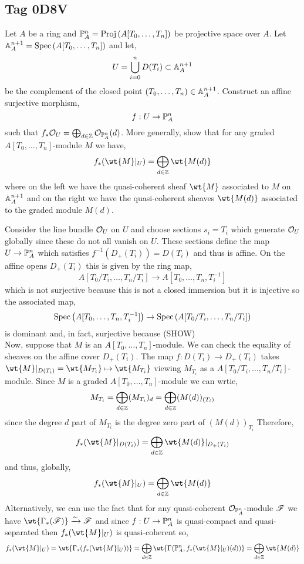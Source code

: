 \documentclass[12pt]{article}
\begin{document}
\subsection{Tag 0D8V}

\begin{exr}
Let $A$ be a ring and $\P^n_A = \Proj{A[T_0, \dots, T_n]}$ be projective space over $A$. Let $\A^{n+1}_A = \Spec{A[T_0, \dots, T_n]}$ and let,
\[ U = \bigcup_{i = 0}^n D(T_i) \subset \A_A^{n+1} \]
be the complement of the closed point $(T_0, \dots, T_n) \in \A_A^{n+1}$. Construct an affine surjective morphism,
\[ f : U \to \P^n_A \]
such that $f_* \struct{U} = \bigoplus_{d \in \Z} \struct{\P^n_A}(d)$. More generally, show that for any graded $A[T_0, \dots, T_n]$-module $M$ we have,
\[ f_*(\wt{M}|_U) = \bigoplus_{d \in \Z} \wt{M(d)} \]
where on the left we have the quasi-coherent sheaf $\wt{M}$ associated to $M$ on $\A^{n+1}_A$ and on the right we have the quasi-coherent sheaves $\wt{M(d)}$ associated to the graded module $M(d)$. 
\end{exr}
\noindent
Consider the line bundle $\struct{U}$ on $U$ and choose sections $s_i = T_i$ which generate $\struct{U}$ globally since these do not all vanish on $U$. These sections define the map $U \to \P^n_A$ which satisfies $f^{-1}(D_{+}(T_i)) = D(T_i)$ and thus is affine. On the affine opens $D_+(T_i)$ this is given by the ring map,
\[ A[T_0/T_i, \dots, T_n/T_i] \to A[T_0, \dots, T_n, T_i^{-1}] \]
which is not surjective because this is not a closed immersion but it is injective so the associated map,
\[ \Spec{A[T_0, \dots, T_n, T_i^{-1}]} \to \Spec{A[T_0/T_i, \dots, T_n/T_i]} \]
is dominant and, in fact, surjective because (SHOW)
\bigskip\\
Now, suppose that $M$ is an $A[T_0, \dots, T_n]$-module. We can check the equality of sheaves on the affine cover $D_+(T_i)$. The map $f : D(T_i) \to D_{+}(T_i)$ takes $\wt{M}|_{D(T_i)} = \wt{M_{T_i}} \mapsto \wt{M_{T_i}}$ viewing  $M_{T_i}$ as a $A[T_0/T_i, \dots, T_n/T_i]$-module. Since $M$ is a graded $A[T_0, \dots, T_n]$-module we can wrtie,
\[ M_{T_i} = \bigoplus_{d \in \Z} (M_{T_i})_d = \bigoplus_{d \in \Z} (M(d))_{(T_i)} \]
since the degree $d$ part of $M_{T_i}$ is the degree zero part of $(M(d))_{T_i}$
Therefore,
\[ f_*(\wt{M}|_{D(T_i)}) = \bigoplus_{d \in \Z} \wt{M(d)} |_{D_+(T_i)} \]  
and thus, globally,
\[ f_*(\wt{M}|_U) = \bigoplus_{d \in \Z} \wt{M(d)} \]
Alternatively, we can use the fact that for any quasi-coherent $\struct{\P^n_A}$-module $\F$ we have $\wt{\Gamma_*(\F)} \xrightarrow{\sim} \F$ and since $f : U \to \P^n_A$ is quasi-compact and quasi-separated then $f_*(\wt{M}|_U)$ is quasi-coherent so,
\[ f_*(\wt{M}|_U) = \wt{\Gamma_*(f_*(\wt{M}|_U))} = \bigoplus_{d \in \Z} \wt{\Gamma(\P^n_A, f_*(\wt{M}|_U)(d))} = \bigoplus_{d \in \Z} \wt{M(d)} \]
\end{document}
